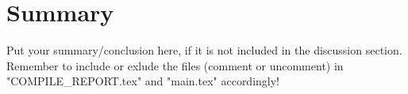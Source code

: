 \section{Summary} \label{sec:summary}

Put your summary/conclusion here, if it is not included in the discussion section. Remember to include or exlude the files (comment or uncomment) in "COMPILE\_REPORT.tex" and "main.tex" accordingly!
